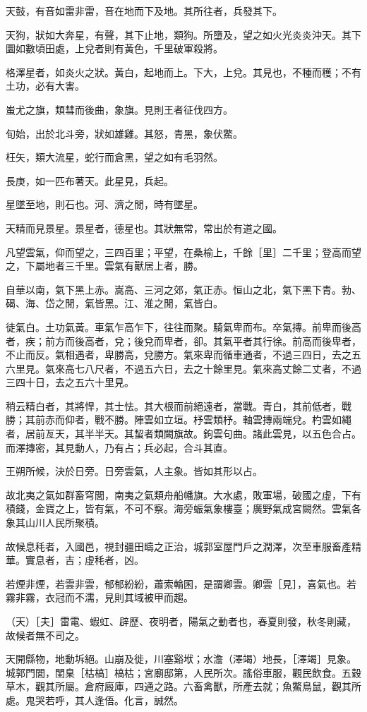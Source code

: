 \documentclass[10pt,fontset=adobe,UTF8,twoside]{ctexrep}
\begin{document}
天鼓，有音如雷非雷，音在地而下及地。其所往者，兵發其下。

天狗，狀如大奔星，有聲，其下止地，類狗。所墮及，望之如火光炎炎沖天。其下圜如數頃田處，上兌者則有黃色，千里破軍殺將。

格澤星者，如炎火之狀。黃白，起地而上。下大，上兌。其見也，不種而穫；不有土功，必有大害。

蚩尤之旗，類彗而後曲，象旗。見則王者征伐四方。

旬始，出於北斗旁，狀如雄雞。其怒，青黑，象伏鱉。

枉矢，類大流星，蛇行而倉黑，望之如有毛羽然。

長庚，如一匹布著天。此星見，兵起。

星墜至地，則石也。河、濟之閒，時有墜星。

天精而見景星。景星者，德星也。其狀無常，常出於有道之國。

凡望雲氣，仰而望之，三四百里；平望，在桑榆上，千餘［里］二千里；登高而望之，下屬地者三千里。雲氣有獸居上者，勝。

自華以南，氣下黑上赤。嵩高、三河之郊，氣正赤。恒山之北，氣下黑下青。勃、碣、海、岱之閒，氣皆黑。江、淮之閒，氣皆白。

徒氣白。土功氣黃。車氣乍高乍下，往往而聚。騎氣卑而布。卒氣摶。前卑而後高者，疾；前方而後高者，兌；後兌而卑者，卻。其氣平者其行徐。前高而後卑者，不止而反。氣相遇者，卑勝高，兌勝方。氣來卑而循車通者，不過三四日，去之五六里見。氣來高七八尺者，不過五六日，去之十餘里見。氣來高丈餘二丈者，不過三四十日，去之五六十里見。

稍云精白者，其將悍，其士怯。其大根而前絕遠者，當戰。青白，其前低者，戰勝；其前赤而仰者，戰不勝。陣雲如立垣。杼雲類杼。軸雲摶兩端兌。杓雲如繩者，居前亙天，其半半天。其蛪者類闕旗故。鉤雲句曲。諸此雲見，以五色合占。而澤摶密，其見動人，乃有占；兵必起，合斗其直。

王朔所候，決於日旁。日旁雲氣，人主象。皆如其形以占。

故北夷之氣如群畜穹閭，南夷之氣類舟船幡旗。大水處，敗軍場，破國之虛，下有積錢，金寶之上，皆有氣，不可不察。海旁蜄氣象樓臺；廣野氣成宮闕然。雲氣各象其山川人民所聚積。

故候息秏者，入國邑，視封疆田疇之正治，城郭室屋門戶之潤澤，次至車服畜產精華。實息者，吉；虛秏者，凶。

若煙非煙，若雲非雲，郁郁紛紛，蕭索輪囷，是謂卿雲。卿雲［見］，喜氣也。若霧非霧，衣冠而不濡，見則其域被甲而趨。

（天）［夫］雷電、蝦虹、辟歷、夜明者，陽氣之動者也，春夏則發，秋冬則藏，故候者無不司之。

天開縣物，地動坼絕。山崩及徙，川塞谿垘；水澹（澤竭）地長，［澤竭］見象。城郭門閭，閨臬［枯槁］槁枯；宮廟邸第，人民所次。謠俗車服，觀民飲食。五穀草木，觀其所屬。倉府廄庫，四通之路。六畜禽獸，所產去就；魚鱉鳥鼠，觀其所處。鬼哭若呼，其人逢俉。化言，誠然。
\end{document}
